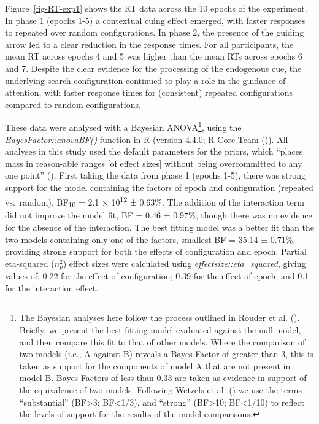 \documentclass[
  man,
  floatsintext,
  longtable,
  nolmodern,
  notxfonts,
  notimes,
  colorlinks=true,linkcolor=blue,citecolor=blue,urlcolor=blue]{apa7}
\begin{document}
Figure~\ref{fig-RT-exp1} shows the RT data across the 10 epochs of the
experiment. In phase 1 (epochs 1-5) a contextual cuing effect emerged,
with faster responses to repeated over random configurations. In phase
2, the presence of the guiding arrow led to a clear reduction in the
response times. For all participants, the mean RT across epochs 4 and 5
was higher than the mean RTs across epochs 6 and 7. Despite the clear
evidence for the processing of the endogenous cue, the underlying search
configuration continued to play a role in the guidance of attention,
with faster response times for (consistent) repeated configurations
compared to random configurations.

These data were analysed with a Bayesian ANOVA\footnote{The Bayesian
  analyses here follow the process outlined in Rouder et al.
  (). Briefly, we present the best
  fitting model evaluated against the null model, and then compare this
  fit to that of other models. Where the comparison of two models (i.e.,
  A against B) reveals a Bayes Factor of greater than 3, this is taken
  as support for the components of model A that are not present in model
  B. Bayes Factors of less than 0.33 are taken as evidence in support of
  the equivalence of two models. Following Wetzels et al.
  () we use the terms ``substantial''
  (BF\textgreater3; BF\textless1/3), and ``strong'' (BF\textgreater10;
  BF\textless1/10) to reflect the levels of support for the results of
  the model comparisons.}, using the \emph{BayesFactor::anovaBF()}
function in R (version 4.4.0; R Core Team
()). All analyses in this study used the
default parameters for the priors, which ``places mass in reason-able
ranges {[}of effect sizes{]} without being overcommitted to any one
point'' (). First
taking the data from phase 1 (epochs 1-5), there was strong support for
the model containing the factors of epoch and configuration (repeated
vs.~random), BF\textsubscript{10} = 2.1 × 10\textsuperscript{12} ±
0.63\%. The addition of the interaction term did not improve the model
fit, BF = 0.46 ± 0.97\%, though there was no evidence for the absence of
the interaction. The best fitting model was a better fit than the two
models containing only one of the factors, smallest BF = 35.14 ± 0.71\%,
providing strong support for both the effects of configuration and
epoch. Partial eta-squared (\(n^2_p\)) effect sizes were calculated
using \emph{effectsize::eta\_squared}, giving values of: 0.22 for the
effect of configuration; 0.39 for the effect of epoch; and 0.1 for the
interaction effect.
\end{document}
